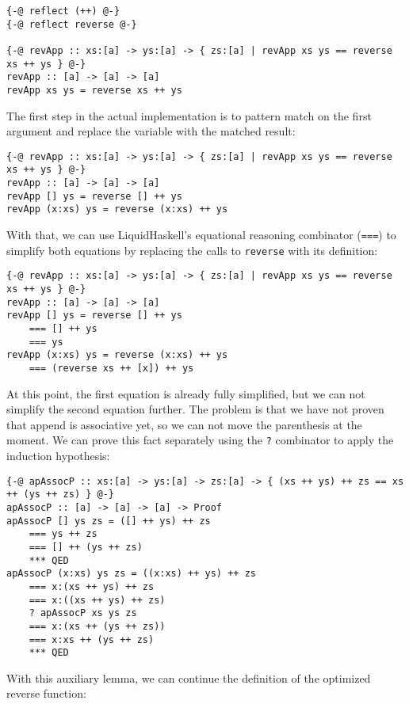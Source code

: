 \documentclass[acmlarge,screen,authorversion=true,nonacm=true]{acmart}
\begin{document}
\begin{lstlisting}
{-@ reflect (++) @-}
{-@ reflect reverse @-}

{-@ revApp :: xs:[a] -> ys:[a] -> { zs:[a] | revApp xs ys == reverse xs ++ ys } @-}
revApp :: [a] -> [a] -> [a]
revApp xs ys = reverse xs ++ ys
\end{lstlisting}

The first step in the actual implementation is to pattern match on the first argument and replace the variable with the matched result:

\begin{lstlisting}
{-@ revApp :: xs:[a] -> ys:[a] -> { zs:[a] | revApp xs ys == reverse xs ++ ys } @-}
revApp :: [a] -> [a] -> [a]
revApp [] ys = reverse [] ++ ys
revApp (x:xs) ys = reverse (x:xs) ++ ys
\end{lstlisting}

With that, we can use LiquidHaskell's equational reasoning combinator (\texttt{===}) to simplify both equations by replacing the calls to \texttt{reverse} with its definition:

\begin{lstlisting}
{-@ revApp :: xs:[a] -> ys:[a] -> { zs:[a] | revApp xs ys == reverse xs ++ ys } @-}
revApp :: [a] -> [a] -> [a]
revApp [] ys = reverse [] ++ ys
    === [] ++ ys
    === ys
revApp (x:xs) ys = reverse (x:xs) ++ ys
    === (reverse xs ++ [x]) ++ ys
\end{lstlisting}

At this point, the first equation is already fully simplified, but we can not simplify the second equation further. The problem is that we have not proven that append is associative yet, so we can not move the parenthesis at the moment. We can prove this fact separately using the \texttt{?} combinator to apply the induction hypothesis:

\begin{lstlisting}
{-@ apAssocP :: xs:[a] -> ys:[a] -> zs:[a] -> { (xs ++ ys) ++ zs == xs ++ (ys ++ zs) } @-}
apAssocP :: [a] -> [a] -> [a] -> Proof
apAssocP [] ys zs = ([] ++ ys) ++ zs
    === ys ++ zs
    === [] ++ (ys ++ zs)
    *** QED
apAssocP (x:xs) ys zs = ((x:xs) ++ ys) ++ zs
    === x:(xs ++ ys) ++ zs
    === x:((xs ++ ys) ++ zs)
    ? apAssocP xs ys zs
    === x:(xs ++ (ys ++ zs))
    === x:xs ++ (ys ++ zs)
    *** QED
\end{lstlisting}

With this auxiliary lemma, we can continue the definition of the optimized reverse function:
\end{document}
